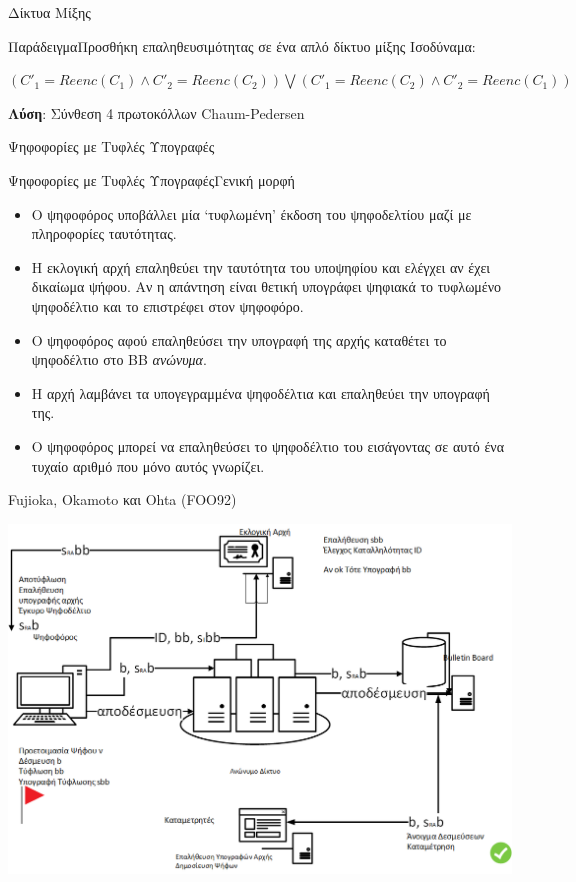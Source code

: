 \documentclass[handout]{beamer}
\begin{document}
\begin{section}{Δίκτυα Μίξης}
\begin{frame}[allowframebreaks]{Παράδειγμα}{Προσθήκη επαληθευσιμότητας σε ένα απλό δίκτυο μίξης}
Ισοδύναμα:
\begin{center}
$(C'_1 = Reenc(C_1) \wedge C'_2 = Reenc(C_2)) \bigvee (C'_1 = Reenc(C_2) \wedge C'_2 = Reenc(C_1))$
\end{center}

 
\textbf{Λύση}: Σύνθεση 4 πρωτοκόλλων Chaum-Pedersen
 
\end{frame}
\end{section} 

\begin{section}{Ψηφοφορίες με Τυφλές Υπογραφές}


\begin{frame}{Ψηφοφορίες με Τυφλές Υπογραφές}{Γενική μορφή}
\begin{itemize}
\item Ο ψηφοφόρος υποβάλλει μία `τυφλωμένη' έκδοση του ψηφοδελτίου μαζί με πληροφορίες ταυτότητας.  \pause 
\item Η εκλογική αρχή επαληθεύει την ταυτότητα του υποψηφίου και ελέγχει αν έχει δικαίωμα ψήφου. Αν η απάντηση είναι θετική υπογράφει ψηφιακά το τυφλωμένο ψηφοδέλτιο και το επιστρέφει στον ψηφοφόρο. \pause 
\item Ο ψηφοφόρος αφού επαληθεύσει την υπογραφή της αρχής καταθέτει το ψηφοδέλτιο στο BB \textit{ανώνυμα}.  \pause 
\item Η αρχή λαμβάνει τα υπογεγραμμένα ψηφοδέλτια και επαληθεύει την υπογραφή της. \pause 
\item O ψηφοφόρος μπορεί να επαληθεύσει το ψηφοδέλτιο του εισάγοντας σε αυτό ένα τυχαίο αριθμό που μόνο αυτός γνωρίζει. 
\end{itemize}

\end{frame}


\begin{frame}{Fujioka, Okamoto και Ohta (FOO92)}
    \begin{center}
        \includegraphics[scale=0.35]{foo.PNG}
    \end{center}
\end{frame}


\end{section}
\end{document}
